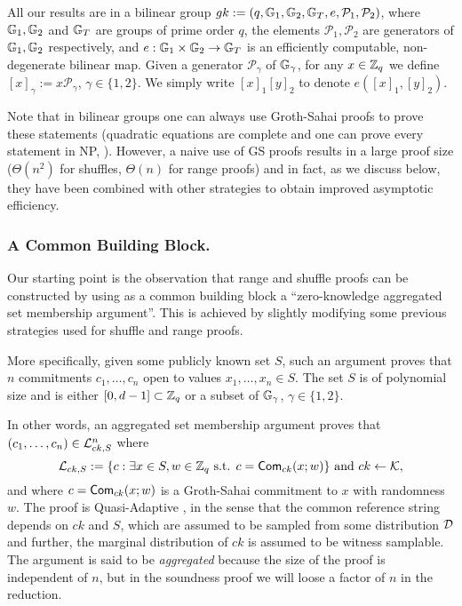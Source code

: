 All our results are in a bilinear group $gk:=(q,\mathbb{G}_1,\mathbb{G}_2,\mathbb{G}_T,e,\mathcal{P}_1,\mathcal{P}_2)$, where $\mathbb{G}_1,\mathbb{G}_2$
and $\mathbb{G}_T$ are groups of prime order $q$, the elements $\mathcal{P}_1, \mathcal{P}_2$ are generators of 
$\mathbb{G}_1,\mathbb{G}_2$ respectively, and $e:\mathbb{G}_1\times\mathbb{G}_2\to\mathbb{G}_T$ is an efficiently
computable, non-degenerate bilinear map. Given a generator $\mathcal{P}_\gamma$ of $\mathbb{G}_\gamma$, for any $x\in\mathbb{Z}_q$ we define $[x]_\gamma:=x\mathcal{P}_\gamma$, $\gamma\in\{1,2\}$. We simply write $[x]_1[y]_2$ to denote $e([x]_1,[y]_2)$.

Note that in bilinear groups one can always use Groth-Sahai proofs to prove these statements (quadratic equations are complete and one can prove every statement in NP, \cite{EC:GroOstSah06}).  However, a  naive use of GS proofs results in a large proof size ($\Theta(n^2)$ for shuffles, $\Theta(n)$ for range proofs) and in fact, as we discuss below, they have been combined with other strategies to obtain improved asymptotic efficiency. 

\subsubsection{A Common Building Block.} Our starting point is the observation that range and shuffle proofs can be constructed by using as a common building block a 
``zero-knowledge aggregated set membership argument''. This is achieved by slightly modifying some previous strategies used for shuffle and range proofs.

More specifically,  given some publicly known set $S$, such an argument proves that $n$ commitments $c_1,\ldots,c_n$ open to values $x_1,\ldots,x_n \in S$.  The set $S$ is of polynomial size and is either $[0,d-1]\subset\mathbb{Z}_q$ or a subset of $\mathbb{G}_\gamma$, $\gamma \in \{1,2\}$. 
 
In other words, an aggregated set membership argument proves that $(c_1,\ldots,c_n) \in \mathcal{L}_{ck,S}^n$ where 
$$
\mathcal{L}_{ck,S}:=\{c: \exists x\in S, w\in\mathbb{Z}_q \text{ s.t. } c=\mathsf{Com}_{ck}(x;w)\}\text{ and }ck\gets\mathcal{K},
$$
and where $c=\mathsf{Com}_{ck}(x;w)$ is a Groth-Sahai commitment to $x$ with randomness $w$. The proof is Quasi-Adaptive \cite{AC:JutRoy13}, in the sense that the common reference string depends on $ck$ and $S$, which are assumed to be sampled from some distribution $\mathcal{D}$
and further, the marginal distribution of $ck$ is assumed to be witness samplable. The argument is said to be \textit{aggregated} because the size of the proof is independent of $n$, but in the soundness proof we will loose a factor of $n$ in the reduction. 

